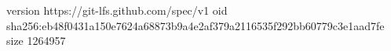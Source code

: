 version https://git-lfs.github.com/spec/v1
oid sha256:eb48f0431a150e7624a68873b9a4e2af379a2116535f292bb60779c3e1aad7fe
size 1264957
